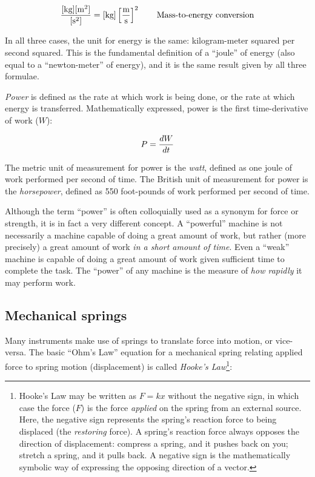 $${[\hbox{kg}][\hbox{m}^2] \over [\hbox{s}^2]} = [\hbox{kg}] \left[\hbox{m} \over \hbox{s}\right]^2 \hbox{\hskip 20pt Mass-to-energy conversion}$$

In all three cases, the unit for energy is the same: kilogram-meter squared per second squared.  This is the fundamental definition of a ``joule'' of energy (also equal to a ``newton-meter'' of energy), and it is the same result given by all three formulae.

\vskip 10pt

\textit{Power} is defined as the rate at which work is being done, or the rate at which energy is transferred.  Mathematically expressed, power is the first time-derivative of work ($W$):

$$P = {dW \over dt}$$

The metric unit of measurement for power is the \textit{watt}, defined as one joule of work performed per second of time.  The British unit of measurement for power is the \textit{horsepower}, defined as 550 foot-pounds of work performed per second of time.

Although the term ``power'' is often colloquially used as a synonym for force or strength, it is in fact a very different concept.  A ``powerful'' machine is not necessarily a machine capable of doing a great amount of work, but rather (more precisely) a great amount of work \textit{in a short amount of time}.  Even a ``weak'' machine is capable of doing a great amount of work given sufficient time to complete the task.  The ``power'' of any machine is the measure of \textit{how rapidly} it may perform work.














\filbreak
\subsection{Mechanical springs}

\label{mechanical_springs}

Many instruments make use of springs to translate force into motion, or vice-versa.  The basic ``Ohm's Law'' equation for a mechanical spring relating applied force to spring motion (displacement) is called \textit{Hooke's Law}\footnote{Hooke's Law may be written as $F = kx$ without the negative sign, in which case the force ($F$) is the force \textit{applied} on the spring from an external source.  Here, the negative sign represents the spring's reaction force to being displaced (the \textit{restoring} force).  A spring's reaction force always opposes the direction of displacement: compress a spring, and it pushes back on you; stretch a spring, and it pulls back.  A negative sign is the mathematically symbolic way of expressing the opposing direction of a vector.}:  

